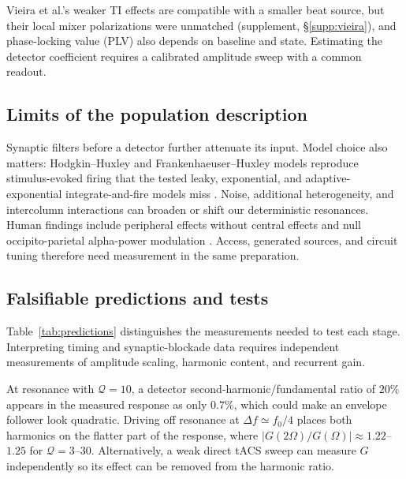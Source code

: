 Vieira et al.'s weaker TI effects \cite{vieira2024} are compatible with a smaller
beat source, but their local mixer polarizations were unmatched (supplement,
\S\ref{supp:vieira}), and phase-locking value (PLV) also depends on baseline and
state. Estimating the detector coefficient requires a calibrated amplitude sweep
with a common readout.

\subsection{Limits of the population description}
Synaptic filters before a detector further attenuate its input. Model choice
also matters: Hodgkin--Huxley and Frankenhaeuser--Huxley models reproduce
stimulus-evoked firing that the tested leaky, exponential, and adaptive-exponential
integrate-and-fire models miss \cite{plovie2025}. Noise, additional heterogeneity,
and intercolumn interactions can broaden or shift our deterministic resonances.
Human findings include peripheral effects without central effects \cite{iszak2023}
and null occipito-parietal alpha-power modulation \cite{mansourinezhad2025}.
Access, generated sources, and circuit tuning therefore need measurement in the
same preparation.

\subsection{Falsifiable predictions and tests}\label{sec:predictions}
Table~\ref{tab:predictions} distinguishes the measurements needed to test each stage.
Interpreting timing and synaptic-blockade data requires independent measurements
of amplitude scaling, harmonic content, and recurrent gain.

At resonance with
$\mathcal Q=10$, a detector second-harmonic/fundamental ratio of $20\%$ appears in
the measured response as only $0.7\%$, which could make an envelope follower look
quadratic. Driving off resonance at $\Delta f\simeq f_0/4$ places both harmonics on
the flatter part of the response, where $|G(2\Omega)/G(\Omega)|\approx1.22$--$1.25$
for $\mathcal Q=3$--$30$. Alternatively, a weak direct tACS sweep can measure $G$
independently so its effect can be removed from the harmonic ratio.

